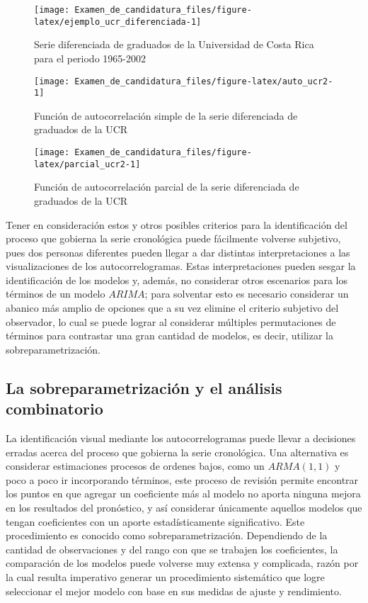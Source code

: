 \documentclass[
]{article}
\begin{document}
\begin{figure}[H]
\texttt{[image: Examen\_de\_candidatura\_files/figure-latex/ejemplo\_ucr\_diferenciada-1]} \caption{Serie diferenciada de graduados de la Universidad de Costa Rica para el periodo 1965-2002}\label{fig:ejemplo_ucr_diferenciada}
\end{figure}

\begin{figure}[H]
\texttt{[image: Examen\_de\_candidatura\_files/figure-latex/auto\_ucr2-1]} \caption{Función de autocorrelación simple de la serie diferenciada de graduados de la UCR}\label{fig:auto_ucr2}
\end{figure}

\begin{figure}[H]
\texttt{[image: Examen\_de\_candidatura\_files/figure-latex/parcial\_ucr2-1]} \caption{Función de autocorrelación parcial de la serie diferenciada de graduados de la UCR}\label{fig:parcial_ucr2}
\end{figure}

Tener en consideración estos y otros posibles criterios para la
identificación del proceso que gobierna la serie cronológica puede
fácilmente volverse subjetivo, pues dos personas diferentes pueden
llegar a dar distintas interpretaciones a las visualizaciones de los
autocorrelogramas. Estas interpretaciones pueden sesgar la
identificación de los modelos y, además, no considerar otros escenarios
para los términos de un modelo \(ARIMA\); para solventar esto es
necesario considerar un abanico más amplio de opciones que a su vez
elimine el criterio subjetivo del observador, lo cual se puede lograr al
considerar múltiples permutaciones de términos para contrastar una gran
cantidad de modelos, es decir, utilizar la sobreparametrización.

\subsection{La sobreparametrización y el análisis combinatorio}

La identificación visual mediante los autocorrelogramas puede llevar a
decisiones erradas acerca del proceso que gobierna la serie cronológica.
Una alternativa es considerar estimaciones procesos de ordenes bajos,
como un \(ARMA(1,1)\) y poco a poco ir incorporando términos, este
proceso de revisión permite encontrar los puntos en que agregar un
coeficiente más al modelo no aporta ninguna mejora en los resultados del
pronóstico, y así considerar únicamente aquellos modelos que tengan
coeficientes con un aporte estadísticamente significativo. Este
procedimiento es conocido como sobreparametrización. Dependiendo de la
cantidad de observaciones y del rango con que se trabajen los
coeficientes, la comparación de los modelos puede volverse muy extensa y
complicada, razón por la cual resulta imperativo generar un
procedimiento sistemático que logre seleccionar el mejor modelo con base
en sus medidas de ajuste y rendimiento.
\end{document}
